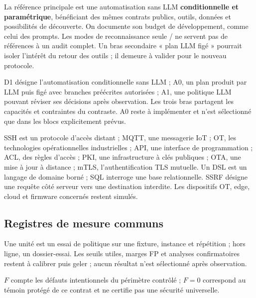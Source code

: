 \documentclass[11pt,a4paper]{article}
\newcommand{\code}[1]{{\small\ttfamily\path{#1}}}
\begin{document}
La référence principale est une automatisation sans LLM \textbf{conditionnelle et paramétrique}, bénéficiant des mêmes contrats publics, outils, données et possibilités de découverte. On documente son budget de développement, comme celui des prompts. Les modes de reconnaissance seule \code{scripted}/\code{vanilla} ne servent pas de références à un audit complet. Un bras secondaire « plan LLM figé » pourrait isoler l'intérêt du retour des outils ; il demeure à valider pour le nouveau protocole.

D1 désigne l’automatisation conditionnelle sans LLM ; A0, un plan produit par LLM puis figé avec branches préécrites autorisées ; A1, une politique LLM pouvant réviser ses décisions après observation. Les trois bras partagent les capacités et contraintes du contraste. A0 reste à implémenter et n’est sélectionné que dans les blocs explicitement prévus.

SSH est un protocole d’accès distant ; MQTT, une messagerie IoT ; OT, les technologies opérationnelles industrielles ; API, une interface de programmation ; ACL, des règles d’accès ; PKI, une infrastructure à clés publiques ; OTA, une mise à jour à distance ; mTLS, l’authentification TLS mutuelle. Un DSL est un langage de domaine borné ; SQL interroge une base relationnelle. SSRF désigne une requête côté serveur vers une destination interdite. Les dispositifs OT, edge, cloud et firmware concernés restent simulés.


\subsection{Registres de mesure communs}
Une unité est un essai de politique sur une fixture, instance et répétition ; hors ligne, un dossier-essai. Les seuils utiles, marges FP et analyses confirmatoires restent à calibrer puis geler ; aucun résultat n'est sélectionné après observation.

$F$ compte les défauts intentionnels du périmètre contrôlé ; $F=0$ correspond au témoin protégé de ce contrat et ne certifie pas une sécurité universelle.
\end{document}
